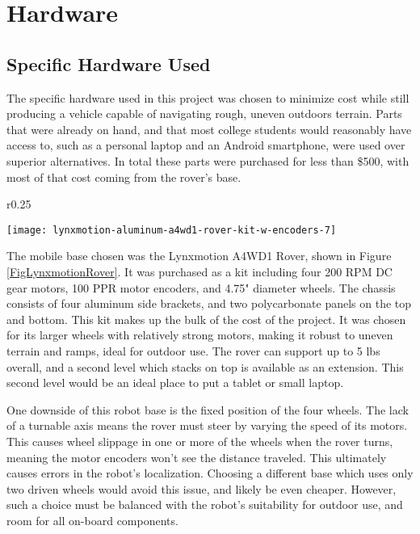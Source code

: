 \chapter{Hardware}

\section{Specific Hardware Used} \label{sectionSpecificHardware}
The specific hardware used in this project was chosen to minimize cost while still producing a vehicle capable of navigating rough, uneven outdoors terrain. Parts that were already on hand, and that most college students would reasonably have access to, such as a personal laptop and an Android smartphone, were used over superior alternatives. In total these parts were purchased for less than \$500, with most of that cost coming from the rover's base.

\begin{wrapfigure}{r}{0.25\textwidth} %
	\caption{Lynxmotion 4WD Rover \cite{fig_lynxmotion_rover}}
	\centering
	\texttt{[image: lynxmotion-aluminum-a4wd1-rover-kit-w-encoders-7]}
	\label{FigLynxmotionRover}
\end{wrapfigure}

The mobile base chosen was the Lynxmotion A4WD1 Rover, shown in Figure \ref{FigLynxmotionRover}. It was purchased as a kit including four 200 RPM DC gear motors, 100 PPR motor encoders, and 4.75" diameter wheels. The chassis consists of four aluminum side brackets, and two polycarbonate panels on the top and bottom. This kit makes up the bulk of the cost of the project. It was chosen for its larger wheels with relatively strong motors, making it robust to uneven terrain and ramps, ideal for outdoor use. The rover can support up to 5 lbs overall, and a second level which stacks on top is available as an extension. This second level would be an ideal place to put a tablet or small laptop.

One downside of this robot base is the fixed position of the four wheels. The lack of a turnable axis means the rover must steer by varying the speed of its motors. This causes wheel slippage in one or more of the wheels when the rover turns, meaning the motor encoders won't see the distance traveled. This ultimately causes errors in the robot's localization. Choosing a different base which uses only two driven wheels would avoid this issue, and likely be even cheaper. However, such a choice must be balanced with the robot's suitability for outdoor use, and room for all on-board components.

